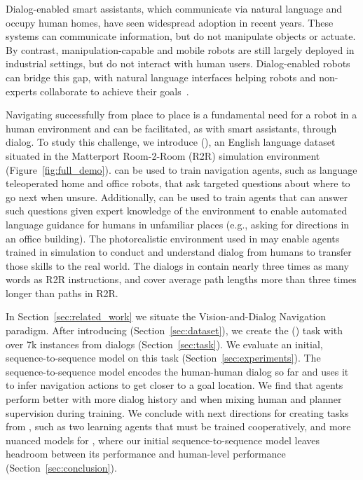 Dialog-enabled smart assistants, which communicate via natural language and occupy human homes, have seen widespread adoption in recent years.
These systems can communicate information, but do not manipulate objects or actuate.
By contrast, manipulation-capable and mobile robots are still largely deployed in industrial settings, but do not interact with human users.
Dialog-enabled robots can bridge this gap, with natural language interfaces helping robots and non-experts collaborate to achieve their goals~\cite{tellex:rss14,chai:ijcai18,thomason:icra19,murnane:siggraph19,williams:auro19}.

Navigating successfully from place to place is a fundamental need for a robot in a human environment and can be facilitated, as with smart assistants, through dialog.
To study this challenge, we introduce \datasetfull{} (\dataset{}), an English language dataset situated in the Matterport Room-2-Room (R2R) simulation environment~\cite{chang:3dv17,anderson:cvpr18} (Figure~\ref{fig:full_demo}).
\dataset{} can be used to train navigation agents, such as language teleoperated  home and office robots, that ask targeted questions about where to go next when unsure.
Additionally, \dataset{} can be used to train agents that can answer such questions given expert knowledge of the environment to enable automated language guidance for humans in unfamiliar places (e.g., asking for directions in an office building).
The photorealistic environment used in \dataset{} may enable agents trained in simulation to conduct and understand dialog from humans to transfer those skills to the real world.
The dialogs in \dataset{} contain nearly three times as many words as R2R instructions, and cover average path lengths more than three times longer than paths in R2R.

In Section~\ref{sec:related_work} we situate the Vision-and-Dialog Navigation paradigm.
After introducing \dataset{} (Section~\ref{sec:dataset}), we create the \taskfull{} (\task{}) task with over 7k instances from \dataset{} dialogs (Section~\ref{sec:task}).
We evaluate an initial, sequence-to-sequence model on this task (Section~\ref{sec:experiments}).
The sequence-to-sequence model encodes the human-human dialog so far and uses it to infer navigation actions to get closer to a goal location.
We find that agents perform better with more dialog history and when mixing human and planner supervision during training.
We conclude with next directions for creating tasks from \dataset{}, such as two learning agents that must be trained cooperatively, and more nuanced models for \task{}, where our initial sequence-to-sequence model leaves headroom between its performance and human-level performance (Section~\ref{sec:conclusion}).
